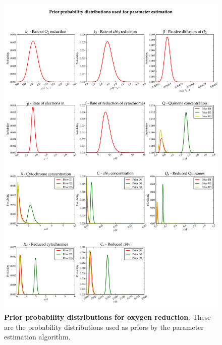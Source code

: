 \begin{figure}[tbp]
 \centering
 \includegraphics[width=15cm, trim=0cm 0cm 0cm 0cm]{./05-oxygenreduction/data/priors2.pdf}
 \caption[Prior probability distributions for oxygen reduction]{{\bf Prior probability distributions for oxygen reduction}. These are the probability distributions used as priors by the parameter estimation algorithm.
 \label{fig:oxypriors1}}
\end{figure}
